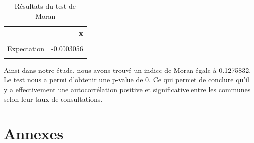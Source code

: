 \documentclass[
]{article}
\begin{document}
\begin{table}[H]
\centering
\caption{\label{tab:unnamed-chunk-29}Résultats du test de Moran}
\centering
\begin{tabular}[t]{lr}
\toprule
  & x\\
\midrule
\cellcolor{gray!10}{Moran I statistic} & \cellcolor{gray!10}{0.1275832}\\
Expectation & -0.0003056\\
\cellcolor{gray!10}{Variance} & \cellcolor{gray!10}{0.0000029}\\
\bottomrule
\end{tabular}
\end{table}

Ainsi dans notre étude, nous avons trouvé un indice de Moran égale à
0.1275832. Le test nous a permi d'obtenir une p-value de 0. Ce qui
permet de conclure qu'il y a effectivement une autocorrélation positive
et significative entre les communes selon leur taux de consultations.

\section{Annexes}\label{annexes}
\end{document}
